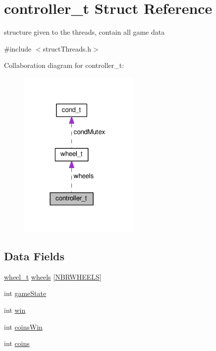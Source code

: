 \hypertarget{structcontroller__t}{\section{controller\+\_\+t Struct Reference}
\label{structcontroller__t}
}


structure given to the threads, contain all game data  




{\ttfamily \#include $<$struct\+Threads.\+h$>$}



Collaboration diagram for controller\+\_\+t\+:\nopagebreak
\begin{figure}[H]
\begin{center}
\leavevmode
\includegraphics[width=165pt]{structcontroller__t__coll__graph}
\end{center}
\end{figure}
\subsection*{Data Fields}
\begin{DoxyCompactItemize}
\item 
\hyperlink{structwheel__t}{wheel\+\_\+t} \hyperlink{structcontroller__t_a3f7af3fa67cf8e8bfba5ce83ca482139}{wheels} \mbox{[}\hyperlink{struct_threads_8h_ad5e0b1909b281e00eebd4a547a701783}{N\+B\+R\+W\+H\+E\+E\+L\+S}\mbox{]}
\item 
int \hyperlink{structcontroller__t_ab7ad0796d84021de0fd46246b3d5096f}{game\+State}
\item 
int \hyperlink{structcontroller__t_a7fee7b546595edcbee920757b6309386}{win}
\item 
int \hyperlink{structcontroller__t_a3642e8c2aae062cde03de850a554d930}{coins\+Win}
\item 
int \hyperlink{structcontroller__t_ad7b19ae27c8e920ec00b72fb993ebd1e}{coins}
\end{DoxyCompactItemize}


